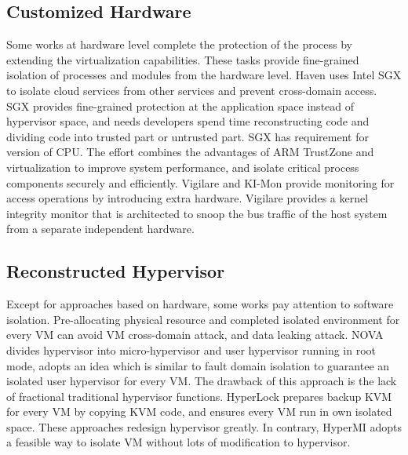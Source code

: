 \documentclass[conference]{IEEEtran}
\begin{document}
\subsection{Customized Hardware }
Some works at hardware level complete the protection of the process by extending the virtualization capabilities. These tasks provide fine-grained isolation of processes and modules from the hardware level. Haven \cite{haven} uses Intel SGX\cite{Hoekstra13cuvillo,Mckeen2013Innovative} to isolate cloud services from other services and prevent cross-domain access. SGX provides fine-grained protection at the application space instead of hypervisor space, and needs developers spend time reconstructing code and dividing code into trusted part or untrusted part. SGX has requirement for version of CPU. The effort \cite{Cho2016Hardware} combines the advantages of ARM TrustZone and virtualization to improve system performance, and isolate critical process components securely and efficiently.
 Vigilare\cite{Moon2012Vigilare} and KI-Mon \cite{Lee2013KI} provide monitoring for access operations by introducing extra hardware. Vigilare provides a kernel integrity monitor that is architected to snoop the bus traffic of the host system from a separate independent hardware. 

\subsection{Reconstructed Hypervisor }
Except for approaches based on hardware, some works\cite{nexen,Steinberg2010NOVA,hyperlock} pay attention to software isolation. Pre-allocating physical resource and completed isolated environment for every VM can avoid VM cross-domain attack, and data leaking attack. NOVA\cite{Steinberg2010NOVA} divides hypervisor into micro-hypervisor and user hypervisor running in root mode, adopts an idea which is similar to fault domain isolation to guarantee an isolated user hypervisor for every VM. The drawback of this approach is the lack of fractional traditional hypervisor functions. HyperLock \cite{hyperlock} prepares backup KVM for every VM by copying KVM code, and ensures every VM run in own isolated space. 
These approaches redesign hypervisor greatly. In contrary, HyperMI adopts a feasible way to isolate VM without lots of modification to hypervisor. 
\end{document}
